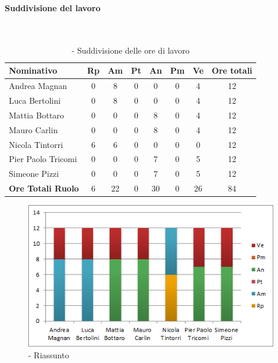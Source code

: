 \documentclass[./PianoDiProgetto.tex]{subfiles}
\begin{document}
\vspace{20 mm}

	\subsubsection{\PerAD}
				\paragraph{Suddivisione del lavoro}\

	\begin{table}[H]
		\begin{tabularx}{\textwidth}{l  * {6}{c}  c}
			\toprule
			\textbf{Nominativo} & \textbf{Rp} & \textbf{Am} & \textbf{Pt}
						& \textbf{An} & \textbf{Pm} & \textbf{Ve} & \textbf{Ore totali} \\
			\midrule
			Andrea Magnan & 0 & 8 &	0 &	0 & 0 & 4 & 12 \\
			Luca Bertolini & 0 & 8 & 0 & 0 & 0 & 4 & 12 \\
			Mattia Bottaro & 0 & 0 & 0 & 8 & 0 & 4 & 12 \\
			Mauro Carlin & 0 & 0 &	0 &	8 & 0 & 4 & 12 \\
			Nicola Tintorri &	6 & 6 & 0 & 0 & 0 & 0 & 12 \\
			Pier Paolo Tricomi & 0 & 0 &	0 &	7 & 0 & 5 & 12 \\
			Simeone Pizzi & 0 & 0 & 0 & 7 & 0 & 5 & 12 \\
			\midrule
			\textbf{Ore Totali Ruolo} & 6 & 22 & 0 & 30 & 0 & 26 & 84 \\
			\bottomrule
		\end{tabularx}
		\caption{\PerAD{} - Suddivisione delle ore di lavoro}
	\end{table}
\newpage

	\vspace{15 mm}


	\begin{figure}[H]
		\centering
		\includegraphics[width=11cm, trim=1cm 0cm 1cm 0cm]{grafici/Ad-persona}
			\caption{\PerAD{} - Riassunto}
	\end{figure}
\end{document}
